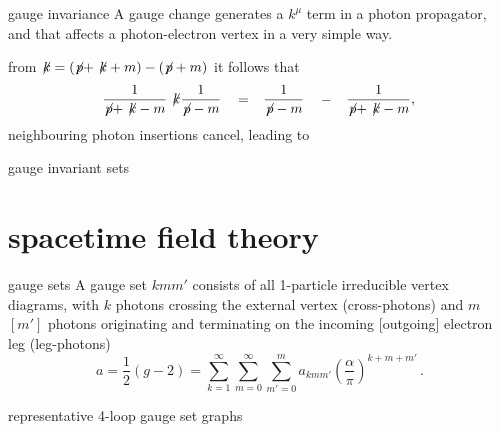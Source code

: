 \begin{frame}{gauge invariance}
A gauge change generates a $k^\mu$ term in a photon propagator,
 and that affects a photon-electron vertex in a very simple way.

\medskip
from \(
\not\!{k} = (\not\!{p}+\not\!{k}+m) - (\not\!{p}+m)
\)
it follows that
\begin{align}
  \begin{tabular}{ccccc}
$\!{\begin{aligned}\frac{1}{\not\!{p}+\not\!{k}-m}\not\!{k}\frac{1}{\not\!{p}-m}\end{aligned}}$ &
$=$ &    $\!{\begin{aligned}\frac{1}{\not\!{p}-m}\end{aligned}}$ &
$-$ &    $\!{\begin{aligned}\frac{1}{\not\!{p}+\not\!{k}-m},\end{aligned}}$
  \end{tabular}
  \nnu %
\end{align}
neighbouring photon insertions cancel, leading to

\vfill\hfill \textcolor{blue!90!black}{gauge invariant sets}
\end{frame}

\section[spacetime field theory]
 {spacetime field theory}
\label{spacetimeFT}

\begin{frame}{gauge sets}
A gauge set $kmm'$ consists of all 1-particle irreducible vertex
diagrams, with $k$ photons crossing the external
vertex (cross-photons) and $m$ $[m']$ photons originating and terminating
on the incoming [outgoing] electron leg (leg-photons)
\[ %
a=\frac{1}{2}(g-2)
       =  \sum_{k=1}^\infty\sum_{m=0}^\infty\sum_{m'=0}^m
          a_{kmm'}\left(\frac{\alpha}{\pi}\right)^{k+m+m'}
\,.
\] %
\end{frame}


\begin{frame}{representative 4-loop gauge set graphs}

\end{frame}

